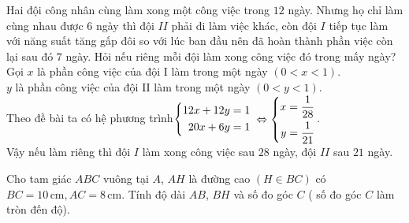 \begin{ex}%
    Hai đội công nhân cùng làm xong một công việc trong $12$ ngày. Nhưng họ chỉ làm cùng nhau được $6$ ngày thì đội $II$ phải đi làm việc khác, còn đội $I$ tiếp tục làm với năng suất tăng gấp đôi so với lúc ban đầu nên đã hoàn thành phần việc còn lại sau đó $7$ ngày. Hỏi nếu riêng mỗi đội làm xong công việc đó trong mấy ngày?
\loigiai
    {
    Gọi $x$ là phần công việc của đội I làm trong một ngày $\left( 0<x<1 \right)$.\\
       $y$ là phần công việc của đội II làm trong một ngày $\left( 0<y<1 \right)$.\\
Theo đề bài ta có hệ phương trình$ \left\{\begin{aligned}12x+12y=1\\20x+6y=1\end{aligned}\right.$
$\Leftrightarrow \left\{\begin{aligned} x=\dfrac{1}{28}  \\ y=\dfrac{1}{21}\end{aligned}\right.$.\\
Vậy nếu làm riêng thì đội $I$ làm xong công việc sau $28$ ngày, đội $II$ sau $ 21$ ngày.
    }
\end{ex}
\begin{ex}%
    Cho tam giác $ABC$ vuông tại $A$, $AH$ là đường cao $(H \in BC)$ có $BC = 10 \mathrm{\,cm}, AC = 8\mathrm{\,cm}$. Tính độ dài $AB$, $BH$ và số đo góc $C$ ( số đo góc $C$ làm tròn đến độ).
\loigiai
    {
    {}
    }
\end{ex}

